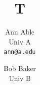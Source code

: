 \documentclass{article}

\title{T}
\author{\begin{tabular}{c}Ann Able\\ Univ A\\ \texttt{ann@a.edu}\end{tabular} \and \begin{minipage}{0.4\textwidth}\centering Bob Baker\\ Univ B\end{minipage}}
\maketitle
Body.

